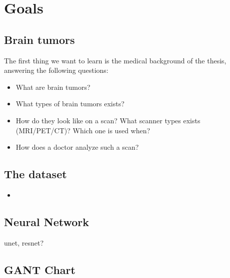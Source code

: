 \chapter{Goals}

\section{Brain tumors}
The first thing we want to learn is the medical background of the thesis, answering the following questions:
\begin{itemize}
    \item What are brain tumors?
    \item What types of brain tumors exists?
    \item How do they look like on a scan? What scanner types exists (MRI/PET/CT)? Which one is used when?
    \item How does a doctor analyze such a scan?
\end{itemize}

\section{The dataset}
\begin{itemize}
    \item 
\end{itemize}

\section{Neural Network}
unet, resnet?


\section{GANT Chart}
